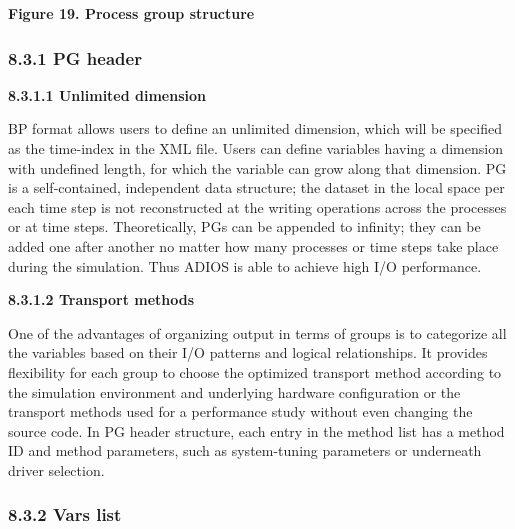 \vspace{34pt}
\begin{center}
{\color{color20} \textbf{Figure 19. Process group structure\label{HToc84890275}\label{HToc212016651}\label{HToc212016893}\label{HToc182553422}}}
\end{center}

\vspace{10pt}
\subsubsection*{{\large \textbf{8.3.1 PG header }}}

\vspace{10pt}
\textbf{8.3.1.1 Unlimited dimension }

\vspace{10pt}
BP format allows users to define an unlimited dimension, which will be specified 
as the time-index in the XML file. Users can define variables having a dimension 
with undefined length, for which the variable can grow along that dimension. PG 
is a self-contained, independent data structure; the dataset in the local space 
per each time step is not reconstructed at the writing operations across the processes 
or at time steps. Theoretically, PGs can be appended to infinity; they can be added 
one after another no matter how many processes or time steps take place during 
the simulation.  Thus ADIOS is able to achieve high I/O performance.

\vspace{10pt}
\textbf{8.3.1.2 Transport methods}

\vspace{10pt}
One of the advantages of organizing output in terms of groups is to categorize 
all the variables based on their I/O patterns and logical relationships. It provides 
flexibility for each group to choose the optimized transport method according to 
the simulation environment and underlying hardware configuration or the transport 
methods used for a performance study without even changing the source code. In 
PG header structure, each entry in the method list has a method ID and method parameters, 
such as system-tuning parameters or underneath driver selection. \label{HToc84890276}\label{HToc212016652}\label{HToc212016894}\label{HToc182553423}

\vspace{10pt}
\subsubsection*{{\large \textbf{8.3.2 Vars list}}}

